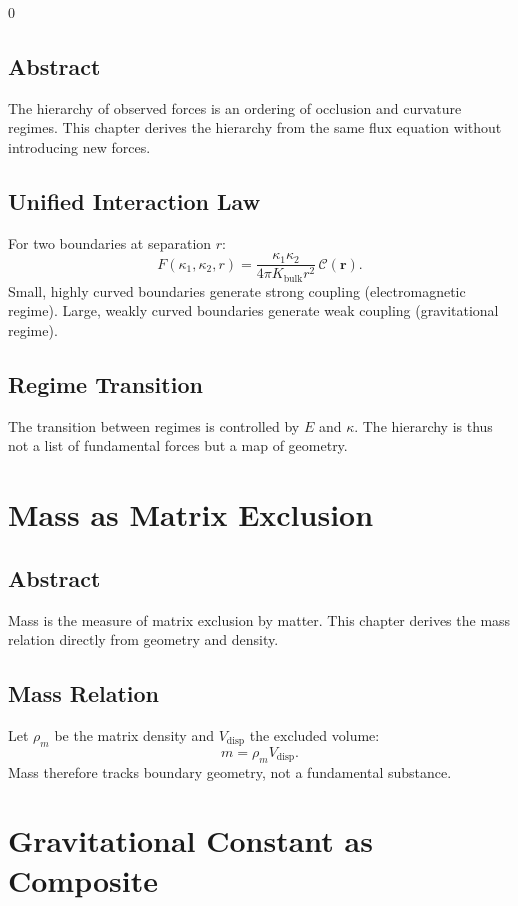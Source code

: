 0\documentclass[12pt]{book}
\begin{document}
\section*{Abstract}
The hierarchy of observed forces is an ordering of occlusion and curvature regimes. This chapter derives
the hierarchy from the same flux equation without introducing new forces.

\section{Unified Interaction Law}
For two boundaries at separation $r$:
\begin{equation}
F(\kappa_1,\kappa_2,r) = \frac{\kappa_1 \kappa_2}{4\pi K_{\text{bulk}} r^2}\,\mathcal{C}(\mathbf{r}).
\end{equation}
Small, highly curved boundaries generate strong coupling (electromagnetic regime). Large, weakly curved
boundaries generate weak coupling (gravitational regime).

\section{Regime Transition}
The transition between regimes is controlled by $E$ and $\kappa$. The hierarchy is thus not a list of
fundamental forces but a map of geometry.

\chapter{Mass as Matrix Exclusion}

\section*{Abstract}
Mass is the measure of matrix exclusion by matter. This chapter derives the mass relation directly from
geometry and density.

\section{Mass Relation}
Let $\rho_m$ be the matrix density and $V_{\text{disp}}$ the excluded volume:
\begin{equation}
m = \rho_m V_{\text{disp}}.
\end{equation}
Mass therefore tracks boundary geometry, not a fundamental substance.

\chapter{Gravitational Constant as Composite}
\end{document}

